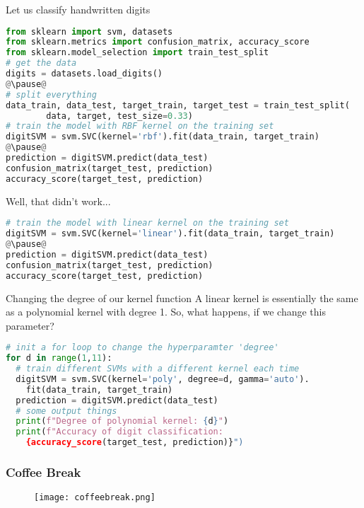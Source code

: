 \begin{frame}[c, fragile]{Let us classify handwritten digits}
  \begin{lstlisting}[language=Python]
from sklearn import svm, datasets
from sklearn.metrics import confusion_matrix, accuracy_score
from sklearn.model_selection import train_test_split
# get the data
digits = datasets.load_digits()
@\pause@
# split everything
data_train, data_test, target_train, target_test = train_test_split(
        data, target, test_size=0.33)
# train the model with RBF kernel on the training set
digitSVM = svm.SVC(kernel='rbf').fit(data_train, target_train)
@\pause@
prediction = digitSVM.predict(data_test)
confusion_matrix(target_test, prediction)
accuracy_score(target_test, prediction)
  \end{lstlisting}
\end{frame}

\begin{frame}[c, fragile]{Well, that didn't work...}
  \pause
  \begin{lstlisting}[language=Python]
# train the model with linear kernel on the training set
digitSVM = svm.SVC(kernel='linear').fit(data_train, target_train)
@\pause@
prediction = digitSVM.predict(data_test)
confusion_matrix(target_test, prediction)
accuracy_score(target_test, prediction)
  \end{lstlisting}
\end{frame}

\begin{frame}[c,fragile]{Changing the degree of our kernel function}
  A linear kernel is essentially the same as a polynomial kernel with
  degree 1. So, what happens, if we change this parameter?
  \pause
  \begin{lstlisting}[language=Python, showstringspaces=false]
# init a for loop to change the hyperparamter 'degree'
for d in range(1,11):
  # train different SVMs with a different kernel each time
  digitSVM = svm.SVC(kernel='poly', degree=d, gamma='auto').
    fit(data_train, target_train)
  prediction = digitSVM.predict(data_test)
  # some output things
  print(f"Degree of polynomial kernel: {d}")
  print(f"Accuracy of digit classification: 
    {accuracy_score(target_test, prediction)}")
  \end{lstlisting}
\end{frame}

\beginbackup

\begin{frame}[c]\frametitle{Coffee Break}
  \begin{figure}[htbp]
    \centering
    \texttt{[image: coffeebreak.png]}
  \end{figure}
\end{frame}

\backupend

